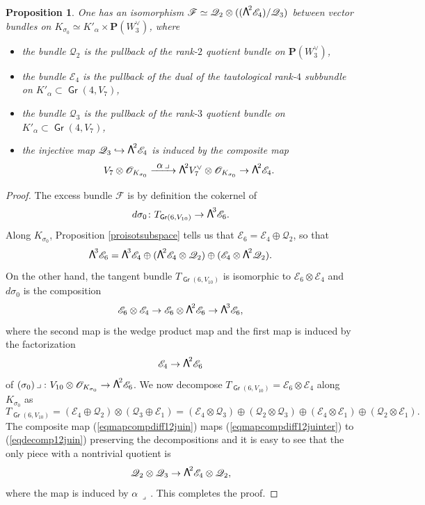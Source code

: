\documentclass[JEP,XML,SOM,Unicode, NoEqCountersInSection,NoFloatCountersInSection]{cedram}
\let\mathcal\mathscr
\newcommand\hto{\mathrel{\lhook\joinrel\to}}
\newcommand\To[1]{\mathchoice{\xrightarrow{\textstyle\kern4pt#1\kern3pt}}{\stackrel{#1}{\longrightarrow}}{}{}}
\newtheorem{prop}[lemm]{Proposition}
\theoremstyle{definition}
\renewcommand\P{{\mathbf P}}\let\PP\P
\newcommand\cE{\mathcal{E}}
\newcommand\cF{\mathcal{F}}
\newcommand\cO{\mathcal{O}}\let\OO\cO
\newcommand\cQ{\mathcal{Q}}\let\quotauto\cQ
\DeclareMathOperator{\Gr}{\mathsf{Gr}}
\let\isom\simeq
\let\cong\simeq
\newcommand\bw[1]{{\hbox{\large$\mathsf{\Lambda}$}^{\!#1}}}
\begin{document}
\begin{prop}\label{proexcessalphabeta}
One has an isomorphism $\cF\cong \cQ_2\otimes((\bw2\cE_4)/\cQ_3)$ between vector bundles on $K_{\sigma_0}\isom K'_\alpha\times \P(W_3^\vee)$, where
\begin{itemize}
\item the bundle $\cQ_2$ is the pullback of
the rank-$2$ quotient bundle on $\P(W_3^\vee)$,
\item the bundle $\cE_4$ is the pullback of the dual of
the tautological rank-$4$ subbundle on $K'_\alpha\subset \Gr(4,V_7)$,
\item the bundle $\cQ_3$ is the pullback of
the rank-$3$ quotient bundle on $K'_\alpha\subset \Gr(4,V_7)$,
\item the injective map $\cQ_3\hto \bw2\cE_4$ is induced by the composite map
\[
V_7\otimes \cO_{K_{\sigma_0}}\To{\alpha\,\lrcorner} \bw2V_7^\vee\otimes \cO_{K_{\sigma_0}}\to \bw2\cE_4
.
\]
\end{itemize}
\end{prop}

\begin{proof} The excess bundle $\cF$ is by definition the cokernel of
\[
d\sigma_0\colon T_{\Gr(6,V_{10})}\to \bw3\cE_6.
\]
Along $K_{\sigma_0}$, Proposition \ref{proisotsubspace} tells us that
$\cE_6=\cE_4\oplus\cQ_2$, so that
\begin{equation}\label{eqdecomp12juin}
\bw3\cE_6=\bw3\cE_4\oplus
(\bw2\cE_4\otimes \cQ_2)\oplus (\cE_4\otimes \bw2\cQ_2).
\end{equation}
On the other hand, the tangent bundle $T_{\Gr(6,V_{10})}$ is isomorphic to
$\cE_6\otimes \cE_4$ and
$d\sigma_0$ is the composition
\begin{equation}\label{eqmapcompdiff12juin}
\cE_6\otimes \cE_4\to \cE_6\otimes \bw2\cE_6\to \bw3\cE_6,
\end{equation}
where the second map is the wedge product map and the first map is
induced by the factorization
\[
\cE_4\to \bw2\cE_6
\]
of $(\sigma_0)\,\lrcorner\,\colon V_{10}\otimes \cO_{K_{\sigma_0}}\to \bw2\cE_6$. We now decompose
$T_{\Gr(6,V_{10})}=\cE_6\otimes \cE_4$ along $K_{\sigma_0}$ as
\begin{equation}\label{eqmapcompdiff12juinter}
T_{\Gr(6,V_{10})}=(\cE_4\oplus \cQ_2)\otimes (\cQ_3\oplus \cE_1)
=(\cE_4\otimes \cQ_3)\oplus( \cQ_2\otimes \cQ_3)\oplus
(\cE_4\otimes\cE_1)\oplus (\cQ_2\otimes \cE_1).
\end{equation}
The composite map (\ref{eqmapcompdiff12juin}) maps (\ref{eqmapcompdiff12juinter}) to
(\ref{eqdecomp12juin}) preserving the decompositions and it is easy to see that the only piece with a nontrivial quotient is
\[
\cQ_2\otimes \cQ_3\to \bw2\cE_4\otimes \cQ_2,
\]
where the map is induced by $\alpha\,\lrcorner{}\,$. This completes the proof.
\end{proof}
\end{document}
